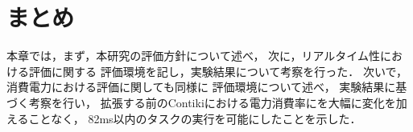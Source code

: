 


\section{まとめ}
本章では，まず，本研究の評価方針について述べ，
次に，リアルタイム性における評価に関する
評価環境を記し，実験結果について考察を行った．
次いで，消費電力における評価に関しても同様に
評価環境について述べ，
実験結果に基づく考察を行い，
拡張する前のContikiにおける電力消費率にを大幅に変化を加えることなく，
82ms以内のタスクの実行を可能にしたことを示した．



